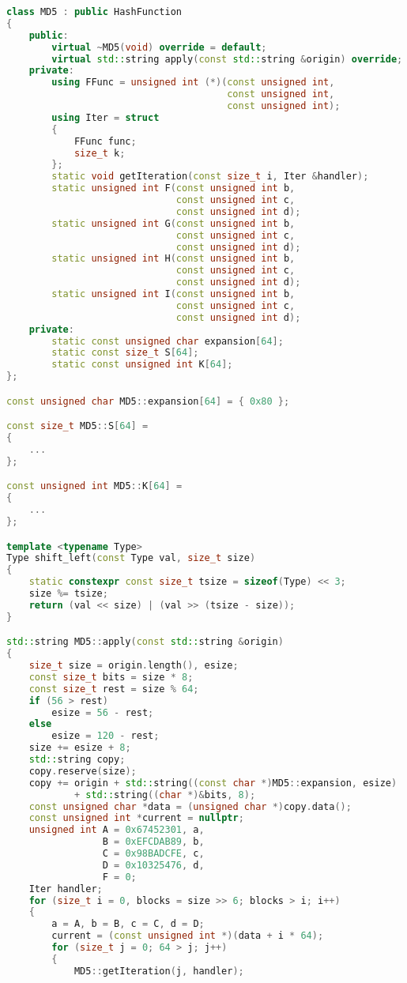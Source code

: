 \begin{lstlisting}[language=c++, caption={Класс, реализующий алгоритм MD5}]
class MD5 : public HashFunction
{
    public:
        virtual ~MD5(void) override = default;
        virtual std::string apply(const std::string &origin) override;
    private:
        using FFunc = unsigned int (*)(const unsigned int,
                                       const unsigned int,
                                       const unsigned int);
        using Iter = struct
        {
            FFunc func;
            size_t k;
        };
        static void getIteration(const size_t i, Iter &handler);
        static unsigned int F(const unsigned int b,
                              const unsigned int c,
                              const unsigned int d);
        static unsigned int G(const unsigned int b,
                              const unsigned int c,
                              const unsigned int d);
        static unsigned int H(const unsigned int b,
                              const unsigned int c,
                              const unsigned int d);
        static unsigned int I(const unsigned int b,
                              const unsigned int c,
                              const unsigned int d);
    private:
        static const unsigned char expansion[64];
        static const size_t S[64];
        static const unsigned int K[64];
};

const unsigned char MD5::expansion[64] = { 0x80 };

const size_t MD5::S[64] =
{
    ...
};

const unsigned int MD5::K[64] =
{
    ...
};

template <typename Type>
Type shift_left(const Type val, size_t size)
{
    static constexpr const size_t tsize = sizeof(Type) << 3;
    size %= tsize;
    return (val << size) | (val >> (tsize - size));
}

std::string MD5::apply(const std::string &origin)
{
    size_t size = origin.length(), esize;
    const size_t bits = size * 8;
    const size_t rest = size % 64;
    if (56 > rest)
        esize = 56 - rest;
    else
        esize = 120 - rest;
    size += esize + 8;
    std::string copy;
    copy.reserve(size);
    copy += origin + std::string((const char *)MD5::expansion, esize)
            + std::string((char *)&bits, 8);
    const unsigned char *data = (unsigned char *)copy.data();
    const unsigned int *current = nullptr;
    unsigned int A = 0x67452301, a,
                 B = 0xEFCDAB89, b,
                 C = 0x98BADCFE, c,
                 D = 0x10325476, d,
                 F = 0;
    Iter handler;
    for (size_t i = 0, blocks = size >> 6; blocks > i; i++)
    {
        a = A, b = B, c = C, d = D;
        current = (const unsigned int *)(data + i * 64);
        for (size_t j = 0; 64 > j; j++)
        {
            MD5::getIteration(j, handler);


\end{lstlisting}
